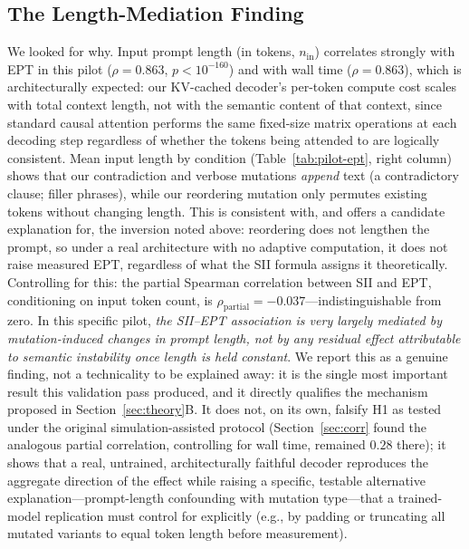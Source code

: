 \documentclass[conference]{IEEEtran}
\begin{document}
\subsection{The Length-Mediation Finding}
\label{sec:pilot-length}
We looked for why. Input prompt length (in tokens, $n_\text{in}$)
correlates strongly with EPT in this pilot ($\rho=0.863$,
$p<10^{-160}$) and with wall time ($\rho=0.863$), which is
architecturally expected: our KV-cached decoder's per-token compute
cost scales with total context length, not with the semantic content
of that context, since standard causal attention performs the same
fixed-size matrix operations at each decoding step regardless of
whether the tokens being attended to are logically consistent.
Mean input length by condition (Table~\ref{tab:pilot-ept}, right
column) shows that our contradiction and verbose mutations
\emph{append} text (a contradictory clause; filler phrases), while our
reordering mutation only permutes existing tokens without changing
length. This is consistent with, and offers a candidate explanation
for, the inversion noted above: reordering does not lengthen the
prompt, so under a real architecture with no adaptive computation, it
does not raise measured EPT, regardless of what the SII formula
assigns it theoretically.
Controlling for this: the partial Spearman correlation between SII
and EPT, conditioning on input token count, is
$\rho_\text{partial}=-0.037$---indistinguishable from zero. In this
specific pilot, \emph{the SII--EPT association is very largely
mediated by mutation-induced changes in prompt length, not by any
residual effect attributable to semantic instability once length is
held constant}. We report this as a genuine finding, not a
technicality to be explained away: it is the single most important
result this validation pass produced, and it directly qualifies the
mechanism proposed in Section~\ref{sec:theory}B. It does not, on its
own, falsify H1 as tested under the original simulation-assisted
protocol (Section~\ref{sec:corr} found the analogous partial
correlation, controlling for wall time, remained $0.28$ there); it
shows that a real, untrained, architecturally faithful decoder
reproduces the aggregate direction of the effect while raising a
specific, testable alternative explanation---prompt-length
confounding with mutation type---that a trained-model replication
must control for explicitly (e.g., by padding or truncating all
mutated variants to equal token length before measurement).
\end{document}
